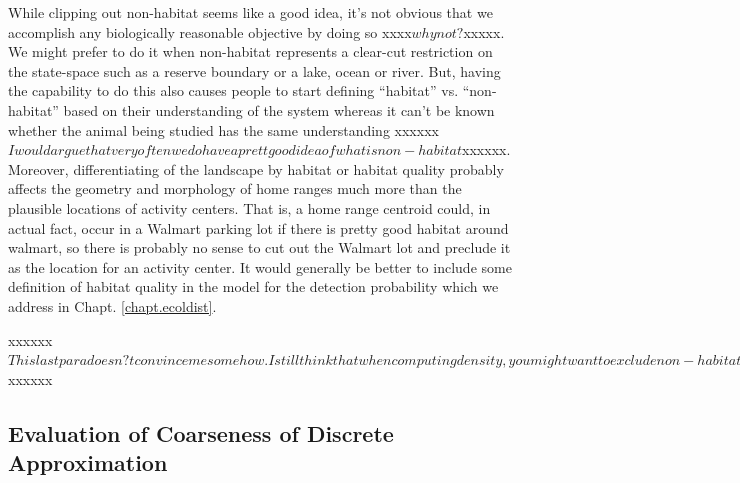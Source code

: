 {While clipping out non-habitat seems like a good idea, it's not obvious
that we accomplish any biologically reasonable objective by doing
so xxxx$why not ?$xxxxx. We might prefer to do it when non-habitat represents a clear-cut
restriction on the state-space such as a reserve boundary or a lake,
ocean or river. But, 
having the capability to do this also causes people to start defining
``habitat'' vs. ``non-habitat'' based on their understanding of the
system whereas it can't be known whether the animal being studied has
the same understanding xxxxxx$I would argue that very often we do have a prett good idea of what is non-habitat$xxxxxx. Moreover, differentiating of the landscape by
habitat or habitat quality probably affects the geometry and
morphology of home ranges much more than the plausible locations of
activity centers. That is, a home range centroid could, in actual
fact, occur in a Walmart parking lot if there is pretty good habitat
around walmart, so there is probably no sense to cut out the Walmart
lot and preclude it as the location for an activity center.  It would
generally be better to include some definition of habitat quality in
the model for the detection probability \citep{royle_etal:2012ecol}
which we address in Chapt. \ref{chapt.ecoldist}.

xxxxxx$This last para doesn?t convince me somehow. I still think that when computing density, you might want to exclude non-habitat. So the guy with its homerange center right on the Walmart parking space should of course count to the estimate of N, but the parking space should be deduced from the state-space. In some way ...$xxxxxx


\subsection{Evaluation of Coarseness of Discrete Approximation}

}
